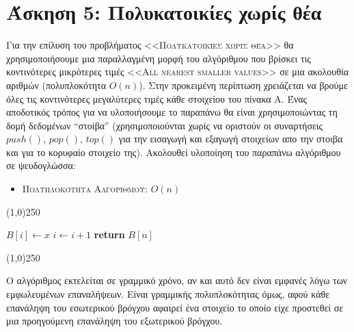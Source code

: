 \documentclass[a4paper,12pt]{report}
\begin{document}
\section*{Άσκηση 5: Πολυκατοικίες χωρίς θέα} 
Για την επίλυση του προβλήματος \textsc{<<Πολυκατοικίες χωρίς θέα>>} θα χρησιμοποιήσουμε μια παραλλαγμένη μορφή του αλγόριθμου που βρίσκει τις κοντινότερες μικρότερες τιμές \textsc{<<All nearest smaller values>>} σε μια ακολουθία αριθμών (πολυπλοκότητα $O(n)$). Στην προκειμένη περίπτωση χρειάζεται να βρούμε όλες τις κοντινότερες μεγαλύτερες τιμές κάθε στοιχείου του πίνακα Α. Ένας αποδοτικός τρόπος για να υλοποιήσουμε το παραπάνω θα είναι χρησιμοποιώντας τη δομή δεδομένων ``στοίβα'' (χρησιμοποιούνται χωρίς να οριστούν οι συναρτήσεις $push()$, $pop()$, $top()$ για την εισαγωγή και εξαγωγή στοιχείων απο την στοιβα και για το κορυφαίο στοιχείο της). Ακολουθεί υλοποίηση του παραπάνω αλγόριθμου σε ψευδογλώσσα:
\begin{itemize}
  \item \textsc{Πολυπλοκότητα Αλγορίθμου}: $O(n)$ 
\end{itemize}
\begin{center}
\line(1,0){250} 
\begin{algorithmic}[1]
   
    \EndWhile
    \Else
      \State $B[i] \gets x$
      \State $i \gets i+1$
    \EndIf
  \EndFor
  \State \textbf{return} $B[n]$ 
\EndProcedure
\end{algorithmic}
\line(1,0){250} 
\end{center} 

Ο αλγόριθμος εκτελείται σε γραμμικό χρόνο, αν και αυτό δεν είναι εμφανές λόγω των εμφωλευμένων επαναλήψεων. Είναι γραμμικής πολυπλοκότητας όμως, αφού κάθε επανάληψη του εσωτερικού βρόγχου αφαιρεί ένα στοιχείο το οποίο είχε προστεθεί σε μια προηγούμενη επανάληψη του εξωτερικού βρόγχου.
\end{document}
